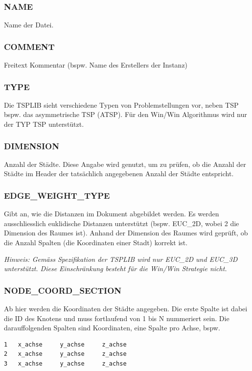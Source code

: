 \documentclass[11pt,a4paper]{article}
\begin{document}
\subsubsection{NAME}
Name der Datei.

\subsubsection{COMMENT}
Freitext Kommentar (bspw. Name des Erstellers der Instanz)

\subsubsection{TYPE}
Die TSPLIB sieht verschiedene Typen von Problemstellungen vor, neben TSP bspw. das asymmetrische TSP (ATSP). Für den Win/Win Algorithmus wird nur der TYP TSP unterstützt.

\subsubsection{DIMENSION}
Anzahl der Städte. Diese Angabe wird genutzt, um zu prüfen, ob die Anzahl der Städte im Header der tatsächlich angegebenen Anzahl der Städte entspricht.

\subsubsection{EDGE\_WEIGHT\_TYPE}
Gibt an, wie die Distanzen im Dokument abgebildet werden. Es werden ausschliesslich euklidische Distanzen unterstützt (bspw. EUC\_2D, wobei 2 die Dimension des Raumes ist).
Anhand der Dimension des Raumes wird geprüft, ob die Anzahl Spalten (die Koordinaten einer Stadt) korrekt ist.

\emph{Hinweis: Gemäss Spezifikation der TSPLIB wird nur EUC\_2D und EUC\_3D unterstützt. Diese Einschränkung besteht für die Win/Win Strategie nicht.}

\subsubsection{NODE\_COORD\_SECTION}
Ab hier werden die Koordinaten der Städte angegeben. Die erste Spalte ist dabei die ID des Knotens und muss fortlaufend von 1 bis N nummeriert sein. Die darauffolgenden Spalten sind Koordinaten, eine Spalte pro Achse, bspw.

\begin{verbatim}
1   x_achse     y_achse     z_achse
2   x_achse     y_achse     z_achse
3   x_achse     y_achse     z_achse
\end{verbatim}
\end{document}
